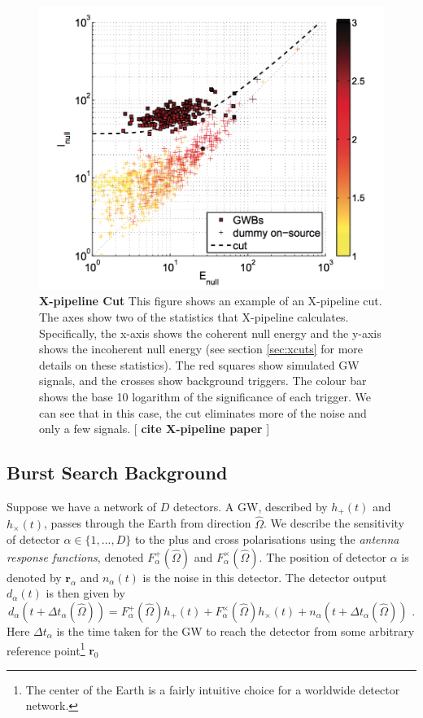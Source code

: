 \documentclass[11pt]{cuthesis}
\newcommand{\fs}{\text{ .}}
\newcommand{\Fp}{F^{+}_{\alpha}}
\newcommand{\Fx}{F^{\times}_{\alpha}}
\newcommand{\xp}{X-pipeline }
\begin{document}
\begin{figure} %
\begin{center}
\includegraphics[width=0.8\linewidth]{xpipeline_cut.png}
\end{center}
\caption{ \textbf{\xp Cut} This figure shows an example of an \xp cut. The axes show two of the statistics that \xp calculates. Specifically, the x-axis shows the coherent null energy and the y-axis shows the incoherent null energy (see section \ref{sec:xcuts} for more details on these statistics). The red squares show simulated GW signals, and the crosses show background triggers. The colour bar shows the base 10 logarithm of the significance of each trigger. We can see that in this case, the cut eliminates more of the noise and only a few signals. [\textbf{ cite \xp paper }]  }
\label{fig:xcuts}
\end{figure}

\subsection{Burst Search Background}
Suppose we have a network of $D$ detectors. A GW, described by $h_+(t)$ and $h_\times (t)$, passes through the Earth from direction $\hat{\Omega}$. We describe the sensitivity of detector $\alpha \in \{1,...,D \}$ to the plus and cross polarisations using the \emph{antenna response functions}, denoted $\Fp (\hat{\Omega})$ and $\Fx(\hat{\Omega})$. The position of detector $\alpha$ is denoted by $\textbf{r}_\alpha$ and $n_\alpha (t)$ is the noise in this detector. The detector output $d_\alpha (t)$ is then given by
\begin{equation} \label{det_output}
d_\alpha (t + \Delta t_\alpha (\hat{\Omega})) = \Fp (\hat{\Omega}) h_+ (t) + \Fx (\hat{\Omega}) h_\times (t) + n_\alpha (t + \Delta t_\alpha (\hat{\Omega})) \fs
\end{equation}   
Here $\Delta t_\alpha$ is the time taken for the GW to reach the detector from some arbitrary reference point\footnote{The center of the Earth is a fairly intuitive choice for a worldwide detector network.} $\textbf{r}_0$
\end{document}
